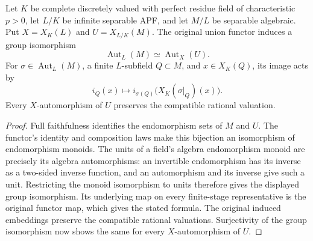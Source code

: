 \begin{lemma}
\label{fw:separable-automorphism-correspondence}
\leanok
Let $K$ be complete discretely valued with perfect residue field of
characteristic $p>0$, let $L/K$ be infinite separable APF, and let
$M/L$ be separable algebraic. Put $X=X_K(L)$ and $U=X_{L/K}(M)$.
The original union functor induces a group isomorphism
\[
 \operatorname{Aut}_L(M)\simeq\operatorname{Aut}_X(U).
\]
For $\sigma\in\operatorname{Aut}_L(M)$, a finite $L$-subfield
$Q\subset M$, and $x\in X_K(Q)$, its image acts by
\[
 i_Q(x)\longmapsto
 i_{\sigma(Q)}\bigl(X_K(\sigma|_Q)(x)\bigr).
\]
Every $X$-automorphism of $U$ preserves the compatible rational valuation.
\end{lemma}
\begin{proof}
Full faithfulness identifies the endomorphism sets of $M$ and $U$.
The functor's identity and composition laws make this bijection an
isomorphism of endomorphism monoids. The units of a field's algebra
endomorphism monoid are precisely its algebra automorphisms: an
invertible endomorphism has its inverse as a two-sided inverse function,
and an automorphism and its inverse give such a unit. Restricting the
monoid isomorphism to units therefore gives the displayed group
isomorphism. Its underlying map on every finite-stage representative
is the original functor map, which gives the stated formula.
The original induced embeddings preserve the compatible rational
valuations. Surjectivity of the group isomorphism now shows the same
for every $X$-automorphism of $U$.
\end{proof}


